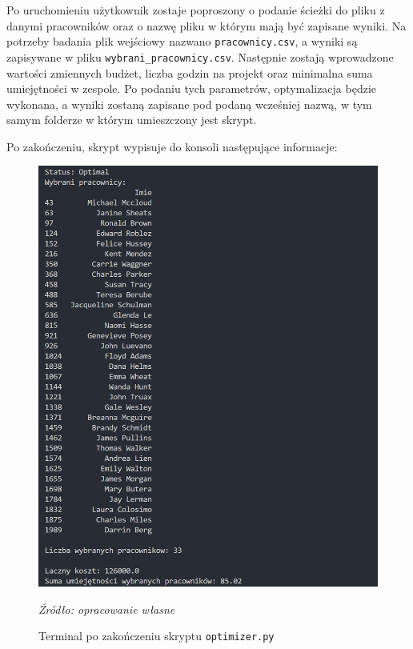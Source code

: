     \par Po uruchomieniu użytkownik zostaje poproszony o podanie ścieżki do pliku z danymi pracowników oraz o nazwę pliku w którym mają być zapisane wyniki. Na potrzeby badania plik wejściowy nazwano \verb|pracownicy.csv|, a wyniki są zapisywane w pliku \verb|wybrani_pracownicy.csv|. Następnie zostają wprowadzone wartości zmiennych budżet, liczba godzin na projekt oraz minimalna suma umiejętności w zespole. Po podaniu tych parametrów, optymalizacja będzie wykonana, a wyniki zostaną zapisane pod podaną wcześniej nazwą, w tym samym folderze w którym umieszczony jest skrypt.

    \par Po zakończeniu, skrypt wypisuje do konsoli następujące informacje:
    \begin{figure}[H]
        \centering
        \includegraphics[width=\linewidth]{chapters/Images/terminal_optimizer.png}
        \cprotect\caption{Terminal po zakończeniu skryptu \verb|optimizer.py|}
        \textit{Źródło: opracowanie własne} 
    \end{figure}

